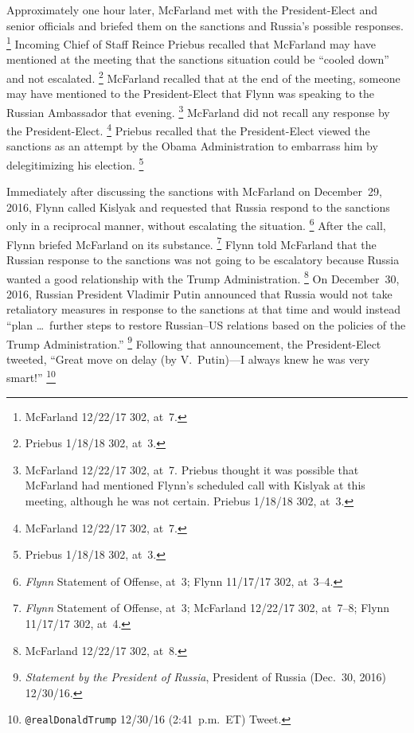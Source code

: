 Approximately one hour later, McFarland met with the President-Elect and senior officials and briefed them on the sanctions and Russia's possible responses.%
\footnote{McFarland 12/22/17 302, at~7.}
Incoming Chief of Staff Reince Priebus recalled that McFarland may have mentioned at the meeting that the sanctions situation could be ``cooled down'' and not escalated.%
\footnote{Priebus 1/18/18 302, at~3.}
McFarland recalled that at the end of the meeting, someone may have mentioned to the President-Elect that Flynn was speaking to the Russian Ambassador that evening.%
\footnote{McFarland 12/22/17 302, at~7.
Priebus thought it was possible that McFarland had mentioned Flynn's scheduled call with Kislyak at this meeting, although he was not certain.
Priebus 1/18/18 302, at~3.}
McFarland did not recall any response by the President-Elect.%
\footnote{McFarland 12/22/17 302, at~7.}
Priebus recalled that the President-Elect viewed the sanctions as an attempt by the Obama Administration to embarrass him by delegitimizing his election.%
\footnote{Priebus 1/18/18 302, at~3.}

Immediately after discussing the sanctions with McFarland on December~29, 2016, Flynn called Kislyak and requested that Russia respond to the sanctions only in a reciprocal manner, without escalating the situation.%
\footnote{\textit{Flynn} Statement of Offense, at~3;
Flynn 11/17/17 302, at~3--4.}
After the call, Flynn briefed McFarland on its substance.%
\footnote{\textit{Flynn} Statement of Offense, at~3;
McFarland 12/22/17 302, at~7--8;
Flynn 11/17/17 302, at~4.}
Flynn told McFarland that the Russian response to the sanctions was not going to be escalatory because Russia wanted a good relationship with the Trump Administration.%
\footnote{McFarland 12/22/17 302, at~8.}
On December~30, 2016, Russian President Vladimir Putin announced that Russia would not take retaliatory measures in response to the sanctions at that time and would instead ``plan \dots\ further steps to restore Russian--US relations based on the policies of the Trump Administration.''%
\footnote{\textit{Statement by the President of Russia}, President of Russia (Dec.~30, 2016) 12/30/16.}
Following that announcement, the President-Elect tweeted, ``Great move on delay (by V.~Putin)---I always knew he was very smart!''%
\footnote{\verb+@realDonaldTrump+ 12/30/16 (2:41~p.m.~ET) Tweet.}

